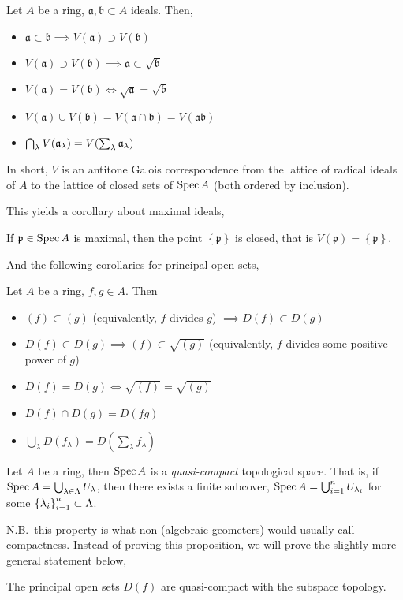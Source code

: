 \documentclass[000-main.tex]{subfiles}
\begin{document}
\begin{lemma}
  Let $A$ be a ring, $\mathfrak{a}, \mathfrak{b}\subset A$ ideals.
  Then,
  \begin{itemize}
    \item $\mathfrak{a}\subset \mathfrak{b}\implies V(\mathfrak{a}) \supset V(\mathfrak{b})$
    \item $V(\mathfrak{a}) \supset V(\mathfrak{b}) \implies \mathfrak{a} \subset \sqrt{\mathfrak{b}}$
    \item $V(\mathfrak{a}) = V(\mathfrak{b}) \iff \sqrt{\mathfrak{a}} = \sqrt{\mathfrak{b}}$
    \item $V(\mathfrak{a}) \cup V(\mathfrak{b}) = V(\mathfrak{a} \cap \mathfrak{b}) = V(\mathfrak{a}\mathfrak{b})$
    \item $\bigcap_\lambda V(\mathfrak{a}_\lambda) = V\qty(\sum_\lambda \mathfrak{a}_\lambda)$
  \end{itemize}
  In short, $V$ is an antitone Galois correspondence from the lattice of radical ideals of $A$ to the lattice of closed sets of $\operatorname{Spec} A$ (both ordered by inclusion).
\end{lemma}
This yields a corollary about maximal ideals,
\begin{corollary}
  If $\mathfrak{p}\in\operatorname{Spec} A$ is maximal, then the point $\left\{ \mathfrak{p} \right\}$ is closed, that is $V(\mathfrak{p}) = \left\{ \mathfrak{p} \right\}$.
\end{corollary}

And the following corollaries for principal open sets,
\begin{corollary}
  Let $A$ be a ring, $f, g\in A$.
  Then
  \begin{itemize}
    \item $(f) \subset (g)$ (equivalently, $f$ divides $g$) $\implies D(f) \subset D(g)$
    \item $D(f) \subset D(g) \implies (f) \subset \sqrt{(g)}$ (equivalently, $f$ divides some positive power of $g$)
    \item $D(f) = D(g) \iff \sqrt{(f)} = \sqrt{(g)}$
    \item $D(f) \cap D(g) = D(fg)$
    \item $\bigcup_\lambda D(f_\lambda) = D(\sum_\lambda f_\lambda)$
  \end{itemize}
\end{corollary}

\begin{proposition}
  Let $A$ be a ring, then $\operatorname{Spec} A$ is a \emph{quasi-compact} topological space.
  That is, if $\operatorname{Spec} A = \bigcup_{\lambda\in \Lambda}U_\lambda$, then there exists a finite subcover, $\operatorname{Spec} A = \bigcup_{i = 1}^n U_{\lambda_i}$ for some ${\qty{\lambda_i}}^n_{i = 1}\subset \Lambda$.
\end{proposition}
N.B.\ this property is what non-(algebraic geometers) would usually call compactness.
Instead of proving this proposition, we will prove the slightly more general statement below,
\begin{proposition}
  The principal open sets $D(f)$ are quasi-compact with the subspace topology.
\end{proposition}
\end{document}
